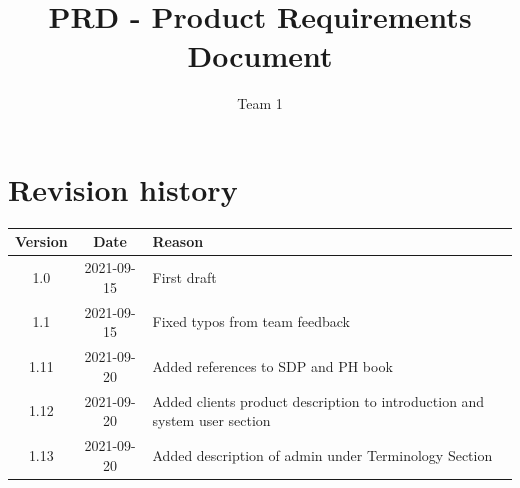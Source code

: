 \documentclass{article}
\title{PRD - Product Requirements Document}
\author{Team 1}
\begin{document}
\date{}
\maketitle
\thispagestyle{fancy}
\newpage

\tableofcontents

\section*{Revision history}
\begin{tabular}{ |c|c|l| } 
 \hline
 Version & Date & Reason \\ \hline
 1.0 & 2021-09-15 & First draft \\ 
 1.1 & 2021-09-15 & Fixed typos from team feedback \\ 
 1.11 & 2021-09-20 & Added references to SDP and PH book\\
 1.12 & 2021-09-20 & Added clients product description to introduction and system user section \\
 1.13 & 2021-09-20 & Added description of admin under Terminology Section\\
 \hline
\end{tabular}

\newpage
\end{document}
